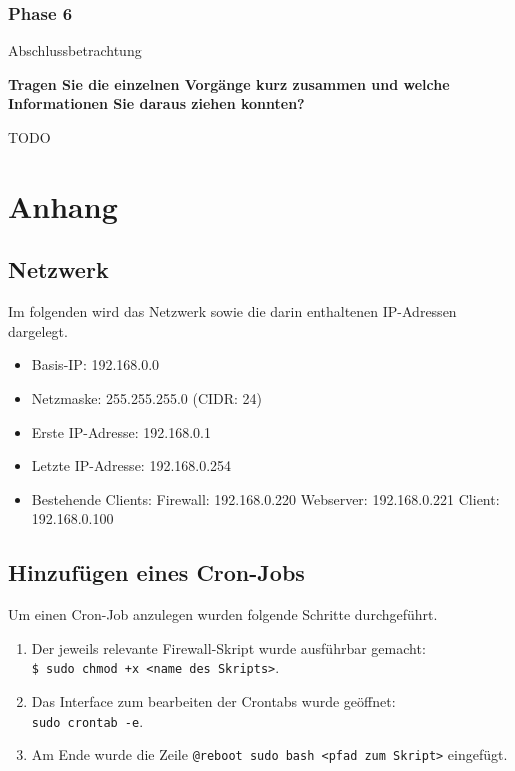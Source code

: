 \documentclass[
    a4paper,
    pagesize,
	pdftex,
    12pt,
]{scrartcl}
\begin{document}
\subsubsection{Phase 6}
Abschlussbetrachtung

\textbf{Tragen Sie die einzelnen Vorgänge kurz zusammen und welche Informationen Sie daraus ziehen konnten?}

TODO
\newpage
\section{Anhang}

\subsection{Netzwerk}
Im folgenden wird das Netzwerk sowie die darin enthaltenen IP-Adressen dargelegt.
\begin{itemize}
	\item Basis-IP: 192.168.0.0
	\item Netzmaske: 255.255.255.0 (CIDR: 24)
	\item Erste IP-Adresse: 192.168.0.1
	\item Letzte IP-Adresse: 192.168.0.254
	\item Bestehende Clients:
		\subitem Firewall: 192.168.0.220
		\subitem Webserver: 192.168.0.221
		\subitem Client: 192.168.0.100
\end{itemize}

\subsection{Hinzufügen eines Cron-Jobs}\label{cron-job}
Um einen Cron-Job anzulegen wurden folgende Schritte durchgeführt.
\begin{enumerate}
	\item Der jeweils relevante Firewall-Skript wurde ausführbar gemacht: \\ \lstinline[breaklines]|$ sudo chmod +x <name des Skripts>|.
	\item Das Interface zum bearbeiten der Crontabs wurde geöffnet: \\ \lstinline[breaklines]|sudo crontab -e|.
	\item Am Ende wurde die Zeile \lstinline[breaklines]|@reboot sudo bash <pfad zum Skript>| eingefügt.
\end{enumerate}
\end{document}
